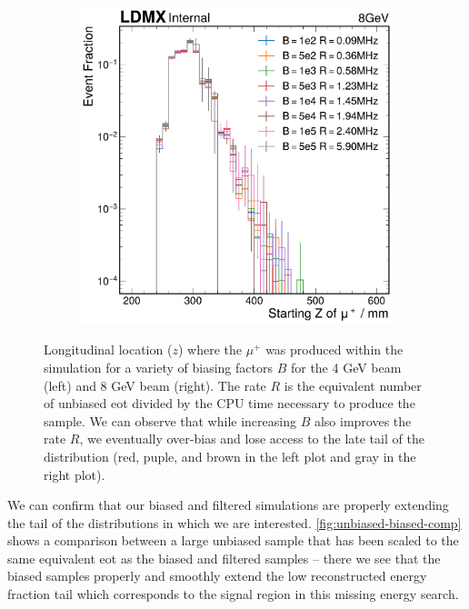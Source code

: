 \begin{figure}
\begin{subfigure}{0.48\textwidth}
    \includegraphics[width=\textwidth]{figures/ldmx/simulation/dimuon-z-8gev.pdf}
  \end{subfigure}
  \caption{
    Longitudinal location ($z$) where the $\mu^+$ was produced within the simulation
    for a variety of biasing factors $B$ for the 4 GeV beam (left) and 8 GeV beam (right).
    The rate $R$ is the equivalent number of unbiased \ac{eot} divided by the CPU time
    necessary to produce the sample.
    We can observe that while increasing $B$ also improves the rate $R$,
    we eventually over-bias and lose access to the late tail of the distribution
    (red, puple, and brown in the left plot and gray in the right plot).
  }
  \label{fig:dimuon-z}
\end{figure}

We can confirm that our biased and filtered simulations are properly extending
the tail of the distributions in which we are interested.
\cref{fig:unbiased-biased-comp} shows a comparison between a large unbiased
sample that has been scaled to the same equivalent \ac{eot} as the biased and
filtered samples -- there we see that the biased samples properly and smoothly
extend the low reconstructed energy fraction tail which corresponds to the
signal region in this missing energy search.

